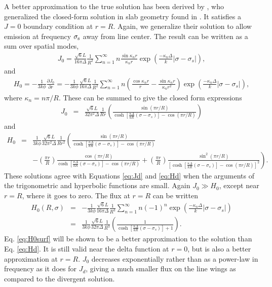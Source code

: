\documentclass[linenumbers]{aastex63}
\newcommand{\be}{\begin{eqnarray}}
\newcommand{\ee}{\end{eqnarray}}
\begin{document}
A better approximation to the true solution has been derived by \citet{2006ApJ...649...14D}, who generalized the closed-form solution in slab geometry found in \citet{1990ApJ...350..216N}. It satisfies a $J=0$ boundary condition at $r=R$. Again, we generalize their solution to allow emission at frequency $\sigma_{\rm s}$ away from line center. The result can be written as a sum over spatial modes,
\be \label{eq:J0_sum}
J_0 = \frac{\sqrt{6}L}{16\pi \Delta} \frac{1}{R^2}\sum_{n=1}^{\infty}n\frac{\sin{\kappa_n r}}{\kappa_n r}\exp{\left(\frac{-\kappa_n \Delta}{k}|\sigma - \sigma_s|\right)},
\ee
and
\be \label{eq:H0_sum}
H_0 = - \frac{1}{3k\phi} \frac{\partial J_0}{\partial r} = -\frac{1}{3k\phi}\frac{\sqrt{6}L}{16\pi\Delta} \frac{1}{R^2}\sum_{n=1}^{\infty}n\left(\frac{\cos{\kappa_n r}}{r} - \frac{\sin{\kappa_n r}}{\kappa_n r^2}\right)\exp{\left(\frac{-\kappa_n \Delta}{k}|\sigma - \sigma_s|\right)},
\ee
where $\kappa_n=n\pi/R$. These can be summed to give the closed form expressions
\be
J_0 & = & \frac{\sqrt{6}L}{32\pi^2 \Delta}
\frac{1}{Rr}
\left( 
\frac{ \sin(\pi r/R) }{ \cosh \left[ \frac{\pi \Delta}{k R} (\sigma - \sigma_s) \right] - \cos(\pi r/R)}
\right)
\label{eq:J0}
\ee
and
\be
H_0 & = &\frac{1}{3k\phi}
\frac{\sqrt{6}L}{32\pi^2 \Delta}
\frac{1}{Rr^2}
\left( 
\frac{ \sin(\pi r/R) }{ \cosh \left[ \frac{\pi \Delta}{k R} (\sigma - \sigma_s) \right] - \cos(\pi r/R)}
\right. \nonumber \\ & & \left. - \left( \frac{\pi r}{R} \right)
\frac{ \cos(\pi r/R) }{ \cosh \left[ \frac{\pi \Delta}{k R} (\sigma - \sigma_s) \right] - \cos(\pi r/R)}
+ \left( \frac{\pi r}{R} \right)
\frac{ \sin^2(\pi r/R) }{ \left[ \cosh \left[ \frac{\pi \Delta}{k R} (\sigma - \sigma_s) \right] - \cos(\pi r/R) \right]^2 }
\right).
\label{eq:H0}
\ee
These solutions agree with Equations \ref{eq:Jd} and \ref{eq:Hd} when the arguments of the trigonometric and hyperbolic functions are small. Again $J_0 \gg H_0$, except near $r=R$, where it goes to zero. The flux at $r=R$ can be written
\be
\nonumber
H_0(R, \sigma) & = & - \frac{1}{3k\phi}
\frac{\sqrt{6}L}{16\pi \Delta}
\frac{1}{R^3}
\sum_{n=1}^{\infty} 
n (-1)^n \exp{\left(\frac{-\kappa_n \Delta}{k}|\sigma - \sigma_s|\right)}\\
& = &  \frac{1}{3k\phi}
\frac{\sqrt{6}L}{32\pi \Delta}
\frac{1}{R^3}
\left( 
\frac{ 1 }{ \cosh \left[ \frac{\pi \Delta}{k R} (\sigma - \sigma_s) \right] +1 }
\right).
\label{eq:H0surf}
\ee
Eq. \ref{eq:H0surf} will be shown to be a better approximation to the solution than Eq. \ref{eq:Hd}. It is still valid near the delta function at $r=0$, but is also a better approximation at $r=R$. $J_0$ decreases exponentially rather than as a power-law in frequency as it does for $J_d$, giving a much smaller flux on the line wings as compared to the divergent solution. 
\end{document}
